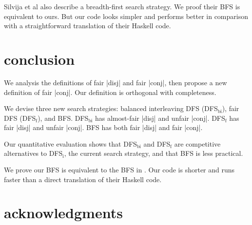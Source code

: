 \documentclass[format=acmlarge, review=true, authordraft=true]{acmart}
\begin{document}
Silvija et al \citet{seres1999algebra} also describe a breadth-first search 
strategy. We proof their BFS is equivalent to ours. But our code looks simpler 
and performs better in comparison with a straightforward translation of their 
Haskell code.

\section{conclusion}

We analysis the definitions of fair \scheme|disj| and fair \scheme|conj|, then propose a 
new definition of fair \scheme|conj|. Our definition is orthogonal with completeness.

We devise three new search strategies: balanced interleaving DFS (DFS$_\textrm{bi}$), fair 
DFS (DFS$_\textrm{f}$), and BFS. DFS$_\textrm{bi}$ has almost-fair \scheme|disj| and unfair \scheme|conj|. DFS$_\textrm{f}$ has 
fair \scheme|disj| and unfair \scheme|conj|. BFS has both fair \scheme|disj| and fair \scheme|conj|.

Our quantitative evaluation shows that DFS$_\textrm{bi}$ and DFS$_\textrm{f}$ are competitive 
alternatives to DFS$_\textrm{i}$, the current search strategy, and that BFS is less 
practical.

We prove our BFS is equivalent to the BFS in \citet{seres1999algebra}. Our code 
is shorter and runs faster than a direct translation of their Haskell code.

\section*{acknowledgments}



\end{document}
